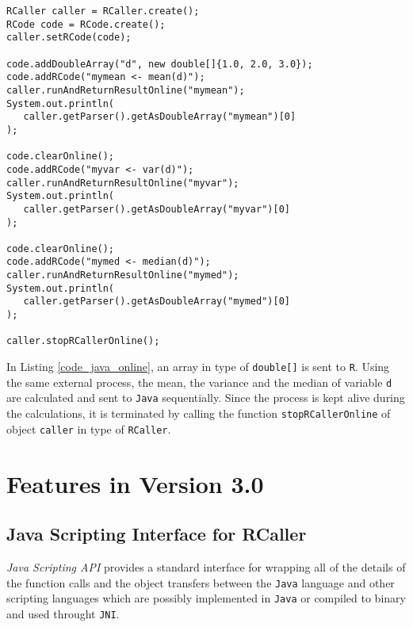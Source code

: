 \documentclass[10pt,a4paper, final, oneside]{article}
\begin{document}
\begin{minipage}{\linewidth}
\begin{lstlisting}[caption=RCaller Online,label=code_java_online]
RCaller caller = RCaller.create();
RCode code = RCode.create();
caller.setRCode(code);

code.addDoubleArray("d", new double[]{1.0, 2.0, 3.0});
code.addRCode("mymean <- mean(d)");
caller.runAndReturnResultOnline("mymean");
System.out.println(
   caller.getParser().getAsDoubleArray("mymean")[0]
);

code.clearOnline();
code.addRCode("myvar <- var(d)");
caller.runAndReturnResultOnline("myvar");
System.out.println(
   caller.getParser().getAsDoubleArray("myvar")[0]
);

code.clearOnline();
code.addRCode("mymed <- median(d)");
caller.runAndReturnResultOnline("mymed");
System.out.println(
   caller.getParser().getAsDoubleArray("mymed")[0]
);

caller.stopRCallerOnline();
\end{lstlisting}
\end{minipage}

In Listing \ref{code_java_online}, an array in type of \texttt{double[]} is sent to \texttt{R}. Using the same external process, the mean, the variance and the median of variable \texttt{d} are calculated and sent to \texttt{Java} sequentially. Since the process is kept alive during the calculations, it is terminated by calling the function \texttt{stopRCallerOnline} of object \texttt{caller} in type of \texttt{RCaller}.

\section{Features in Version 3.0}
\label{sec:features_in_version_3}

\subsection{Java Scripting Interface for RCaller}
\label{sec:javax_script_interface}
\emph{Java Scripting API} provides a standard interface for wrapping all of the details of the function calls and the object transfers between the \texttt{Java} language and other scripting languages which are possibly implemented in \texttt{Java} or compiled to binary and used throught \texttt{JNI}. 
\end{document}
